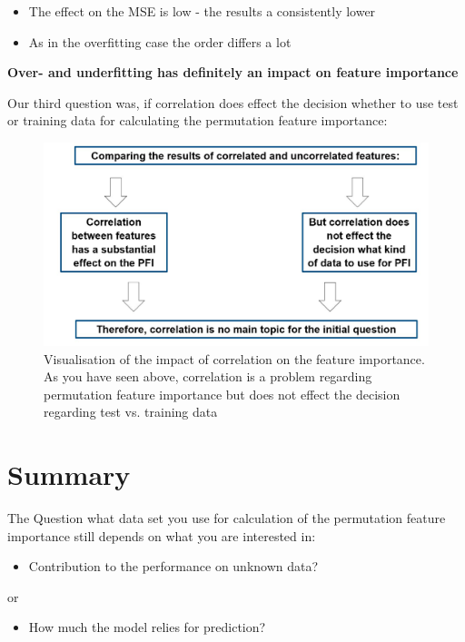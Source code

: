 \documentclass[]{krantz}
\providecommand{\tightlist}{%
  \setlength{\itemsep}{0pt}\setlength{\parskip}{0pt}}
\begin{document}
\begin{itemize}
\tightlist
\item
  The effect on the MSE is low - the results a consistently lower
\item
  As in the overfitting case the order differs a lot
\end{itemize}

\textbf{Over- and underfitting has definitely an impact on feature
importance}

Our third question was, if correlation does effect the decision whether
to use test or training data for calculating the permutation feature
importance:

\begin{figure}

{\centering \includegraphics[width=0.7\linewidth]{images/summary_correlation} 

}

\caption{Visualisation of the impact of correlation on the feature importance. As you have seen above, correlation is a problem regarding permutation feature importance but does not effect the decision regarding test vs. training data}\label{fig:unnamed-chunk-60}
\end{figure}

\section{Summary}\label{summary-2}

The Question what data set you use for calculation of the permutation
feature importance still depends on what you are interested in:

\begin{itemize}
\tightlist
\item
  Contribution to the performance on unknown data?
\end{itemize}

or

\begin{itemize}
\tightlist
\item
  How much the model relies for prediction?
\end{itemize}
\end{document}
